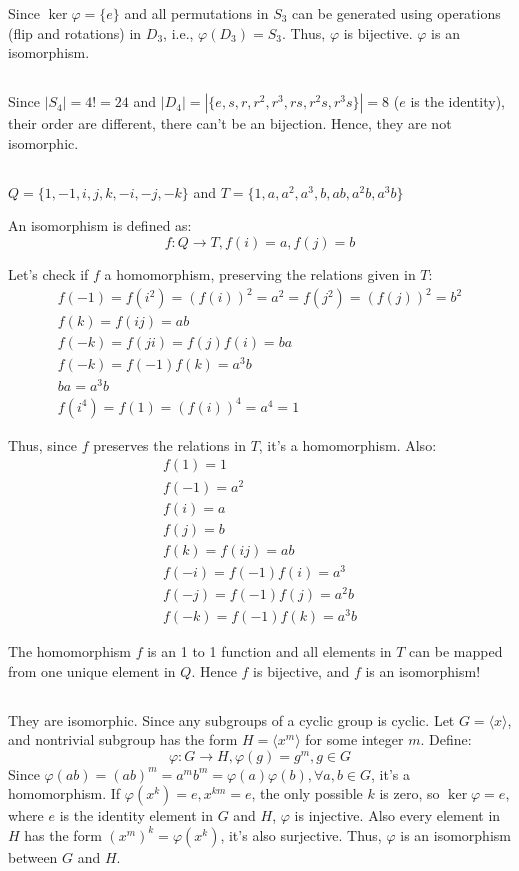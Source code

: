 \documentclass[12pt]{article}
\begin{document}
Since $\ker\varphi=\{e\}$ and all permutations in $S_3$ can be generated using operations (flip and rotations) in $D_3$, i.e., $\varphi{(D_3)}=S_3$. Thus, $\varphi$ is bijective. $\varphi$ is an isomorphism.


\subsection{} %
Since $|S_4|=4!=24$ and $|D_4|=|\{e,s,r,r^2,r^3,rs,r^2s,r^3s\}|=8$ ($e$ is the identity), their order are different, there can't be an bijection. Hence, they are not isomorphic.
\subsection{} %
$Q=\{1, -1, i, j, k, -i, -j, -k\}$ and $T=\{1,a,a^2,a^3,b,ab,a^2b,a^3b\}$

An isomorphism is defined as:
$$f:Q\rightarrow T, f(i)=a,f(j)=b$$

Let's check if $f$ a homomorphism, preserving the relations given in $T$:
\begin{align*}
f(-1)=f(i^2)=(f(i))^2=a^2=f(j^2)=(f(j))^2=b^2 \\
f(k)=f(ij)=ab \\
f(-k)=f(ji)=f(j)f(i)=ba \\
f(-k)=f(-1)f(k)=a^3b \\
ba=a^3b \\
f(i^4)=f(1)=(f(i))^4=a^4=1
\end{align*}

Thus, since $f$ preserves the relations in $T$, it's a homomorphism. Also:
\begin{align*}
f(1)=1 \\
f(-1)=a^2 \\
f(i)=a \\
f(j)=b \\
f(k)=f(ij)=ab\\
f(-i)=f(-1)f(i)=a^3\\
f(-j)=f(-1)f(j)=a^2b\\
f(-k)=f(-1)f(k)=a^3b
\end{align*}

The homomorphism $f$ is an 1 to 1 function and all elements in $T$ can be mapped from one unique element in $Q$. Hence $f$ is bijective, and $f$ is an isomorphism!

\subsection{} %
They are isomorphic. Since any subgroups of a cyclic group is cyclic. Let $G=\langle x\rangle$, and nontrivial subgroup has the form $H=\langle x^m\rangle$ for some integer $m$. Define:
$$\varphi:G\rightarrow H,\varphi(g)=g^{m},g\in G$$ 
Since $\varphi(ab)=(ab)^{m}=a^mb^m=\varphi(a)\varphi(b),\forall a,b\in G$, it's a homomorphism. If $\varphi(x^k)=e, x^{km}=e$, the only possible $k$ is zero, so $\ker\varphi=e$, where $e$ is the identity element in $G$ and $H$, $\varphi$ is injective. Also every element in $H$ has the form $(x^m)^k=\varphi(x^k)$, it's also surjective. Thus, $\varphi$ is an isomorphism between $G$ and $H$.
\newpage
\end{document}

